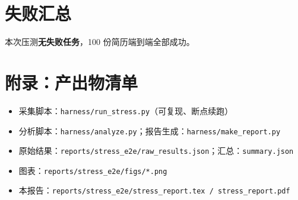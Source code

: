 \documentclass[11pt,a4paper]{ctexart}
\begin{document}
\section{失败汇总}
本次压测\textbf{无失败任务}，100 份简历端到端全部成功。


\section*{附录：产出物清单}
\begin{itemize}[leftmargin=1.4em]
  \item 采集脚本：\texttt{harness/run\_stress.py}（可复现、断点续跑）
  \item 分析脚本：\texttt{harness/analyze.py}；报告生成：\texttt{harness/make\_report.py}
  \item 原始结果：\texttt{reports/stress\_e2e/raw\_results.json}；汇总：\texttt{summary.json}
  \item 图表：\texttt{reports/stress\_e2e/figs/*.png}
  \item 本报告：\texttt{reports/stress\_e2e/stress\_report.tex / stress\_report.pdf}
\end{itemize}
\end{document}
